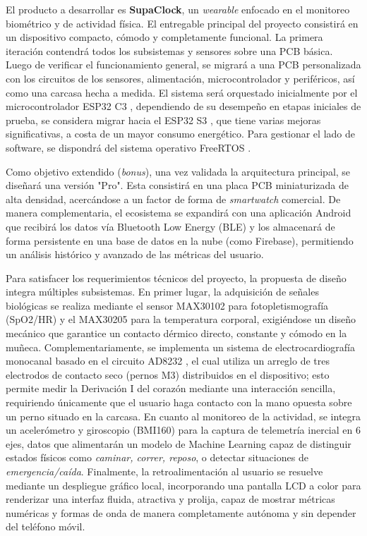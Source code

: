 \documentclass[letterpaper,11pt]{article}
\begin{document}
El producto a desarrollar es \textbf{SupaClock}, un \textit{wearable} enfocado en el monitoreo biométrico y de actividad física. El entregable principal del proyecto consistirá en un dispositivo compacto, cómodo y completamente funcional. La primera iteración contendrá todos los subsistemas y sensores sobre una PCB básica. Luego de verificar el funcionamiento general, se migrará a una PCB personalizada con los circuitos de los sensores, alimentación, microcontrolador y periféricos, así como una carcasa hecha a medida. El sistema será orquestado inicialmente por el microcontrolador ESP32 C3 \citep{esp32c3_ds}, dependiendo de su desempeño en etapas iniciales de prueba, se considera migrar hacia el ESP32 S3 \citep{esp32s3_ds}, que tiene varias mejoras significativas, a costa de un mayor consumo energético. Para gestionar el lado de software, se dispondrá del sistema operativo FreeRTOS \citep{freertos_ref}.

Como objetivo extendido (\textit{bonus}), una vez validada la arquitectura principal, se diseñará una versión "Pro". Esta consistirá en una placa PCB miniaturizada de alta densidad, acercándose a un factor de forma de \textit{smartwatch} comercial. De manera complementaria, el ecosistema se expandirá con una aplicación Android que recibirá los datos vía Bluetooth Low Energy (BLE) y los almacenará de forma persistente en una base de datos en la nube (como Firebase), permitiendo un análisis histórico y avanzado de las métricas del usuario.

Para satisfacer los requerimientos técnicos del proyecto, la propuesta de diseño integra múltiples subsistemas. En primer lugar, la adquisición de señales biológicas se realiza mediante el sensor MAX30102 \citep{max30102_ds} para fotopletismografía (SpO2/HR) y el MAX30205 \citep{max30205_ds} para la temperatura corporal, exigiéndose un diseño mecánico que garantice un contacto dérmico directo, constante y cómodo en la muñeca. Complementariamente, se implementa un sistema de electrocardiografía monocanal basado en el circuito AD8232 \citep{ad8232_ds}, el cual utiliza un arreglo de tres electrodos de contacto seco (pernos M3) distribuidos en el dispositivo; esto permite medir la Derivación I del corazón mediante una interacción sencilla, requiriendo únicamente que el usuario haga contacto con la mano opuesta sobre un perno situado en la carcasa. En cuanto al monitoreo de la actividad, se integra un acelerómetro y giroscopio (BMI160) \citep{bmi160_ds} para la captura de telemetría inercial en 6 ejes, datos que alimentarán un modelo de Machine Learning capaz de distinguir estados físicos como \textit{caminar, correr, reposo}, o detectar situaciones de \textit{emergencia/caída}. Finalmente, la retroalimentación al usuario se resuelve mediante un despliegue gráfico local, incorporando una pantalla LCD a color \citep{st7789_ds} para renderizar una interfaz fluida, atractiva y prolija, capaz de mostrar métricas numéricas y formas de onda de manera completamente autónoma y sin depender del teléfono móvil.
\end{document}
